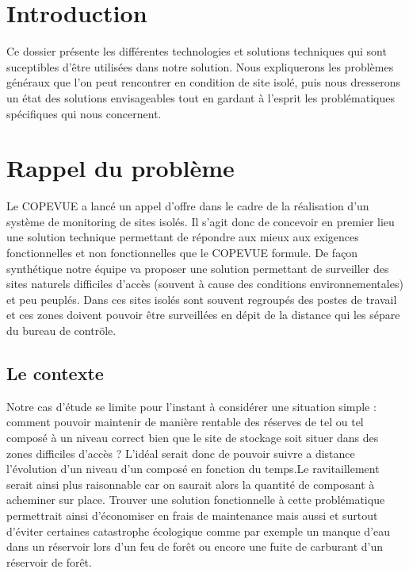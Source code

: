 \section{Introduction}


Ce dossier présente les différentes technologies et solutions techniques qui sont suceptibles d’être utilisées dans notre solution. Nous expliquerons les problèmes généraux que l’on peut rencontrer en condition de site isolé, puis nous dresserons un état des solutions envisageables tout en gardant à l'esprit les problématiques spécifiques qui nous concernent.

\section{Rappel du problème}
Le COPEVUE a lancé un appel d'offre dans le cadre de la réalisation d'un système de monitoring de sites isolés. Il s'agit donc de concevoir en premier lieu une solution technique permettant de répondre aux mieux aux exigences fonctionnelles et non fonctionnelles que le COPEVUE formule. De façon synthétique notre équipe va proposer une solution permettant de surveiller des sites naturels difficiles d'accès (souvent à cause des conditions environnementales) et peu peuplés. Dans ces sites isolés sont souvent regroupés des postes de travail et ces zones doivent pouvoir être surveillées en dépit de la distance qui les sépare du bureau de contröle.
\subsection{Le contexte}
Notre cas d'étude se limite pour l'instant à considérer une situation simple : comment pouvoir maintenir de manière rentable des réserves de tel ou tel composé à un niveau correct bien que le site de stockage soit situer dans des zones difficiles d'accès ? L'idéal serait donc de pouvoir suivre a distance l'évolution d'un niveau d'un composé en fonction du temps.Le ravitaillement serait ainsi plus raisonnable car on saurait alors la quantité de composant à acheminer sur place. Trouver une solution fonctionnelle à cette problématique permettrait ainsi d'économiser en frais de maintenance mais aussi et surtout d'éviter certaines catastrophe écologique comme par exemple un manque d'eau dans un réservoir lors d'un feu de forêt ou encore une fuite de carburant d'un réservoir de forêt.

